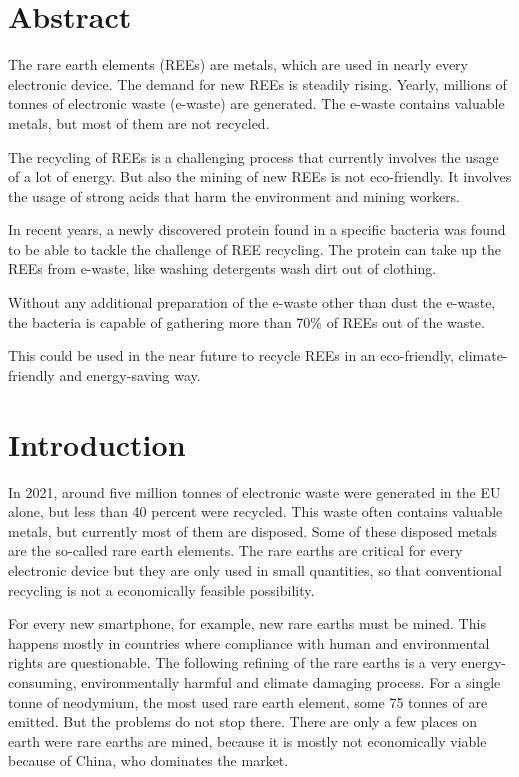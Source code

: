 \chapter*{Abstract}

The rare earth elements (REEs) are metals, which are used in nearly every electronic device.
The demand for new REEs is steadily rising.
Yearly, millions of tonnes of electronic waste (e-waste) are generated.
The e-waste contains valuable metals, but most of them are not recycled.

The recycling of REEs is a challenging process that currently involves the usage of a lot of energy.
But also the mining of new REEs is not eco-friendly.
It involves the usage of strong acids that harm the environment and mining workers.

In recent years, a newly discovered protein found in a specific bacteria was found to be able to tackle the challenge of REE recycling.
The protein can take up the REEs from e-waste, like washing detergents wash dirt out of clothing.

Without any additional preparation of the e-waste other than dust the e-waste, the bacteria is capable of gathering more than 70\% of REEs out of the waste.

This could be used in the near future to recycle REEs in an eco-friendly, climate-friendly and energy-saving way.

\chapter*{Introduction}

In 2021, around five million tonnes of electronic waste were generated in the EU alone, but less than 40 percent were recycled.
This waste often contains valuable metals, but currently most of them are disposed.
Some of these disposed metals are the so-called rare earth elements.
The rare earths are critical for every electronic device but they are only used in small quantities, so that conventional recycling is not a economically feasible possibility.

For every new smartphone, for example, new rare earths must be mined.
This happens mostly in countries where compliance with human and environmental rights are questionable.
The following refining of the rare earths is a very energy-consuming, environmentally harmful and climate damaging process.
For a single tonne of neodymium, the most used rare earth element, some 75 tonnes of  are emitted.
But the problems do not stop there.
There are only a few places on earth were rare earths are mined, because it is mostly not economically viable because of China, who dominates the market.

